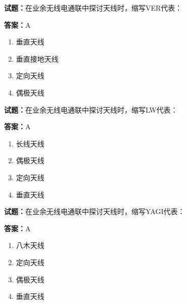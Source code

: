 \documentclass{ctexbook}
\begin{document}




\vspace{1em}

\textbf{试题：}在业余无线电通联中探讨天线时，缩写VER代表： 

\textbf{答案：}A 

\begin{enumerate}[leftmargin=3em]
  \item 垂直天线 

  \item 垂直接地天线 

  \item 定向天线 

  \item 偶极天线 

\end{enumerate}





\vspace{1em}

\textbf{试题：}在业余无线电通联中探讨天线时，缩写LW代表： 

\textbf{答案：}A 

\begin{enumerate}[leftmargin=3em]
  \item 长线天线 

  \item 偶极天线 

  \item 定向天线 

  \item 垂直天线 

\end{enumerate}





\vspace{1em}

\textbf{试题：}在业余无线电通联中探讨天线时，缩写YAGI代表： 

\textbf{答案：}A 

\begin{enumerate}[leftmargin=3em]
  \item 八木天线 

  \item 定向天线 

  \item 偶极天线 


  \item 垂直天线 

\end{enumerate}
\end{document}

